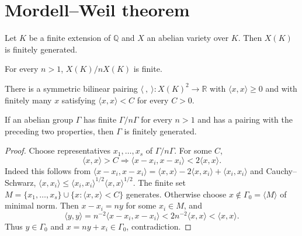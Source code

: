 \section{Mordell--Weil theorem}
\label{mumford-appendix-II-source}

\begin{theorem}\label{mumford-thm-mordell-weil}
Let $K$ be a finite extension of $\mathbb Q$ and $X$ an abelian variety over
$K$. Then $X(K)$ is finitely generated.
\end{theorem}
\begin{proposition}\label{mumford-prop-weak-mordell-weil}
\label{mumford-thm-weak-mordell-weil}
For every $n>1$, $X(K)/nX(K)$ is finite.
\end{proposition}
\begin{proposition}\label{mumford-prop-height-quadratic}
\label{mumford-prop-canonical-height}
There is a symmetric bilinear pairing $\langle\ ,\ \rangle:X(K)^2\to\mathbb R$
with $\langle x,x\rangle\ge0$ and with finitely many $x$ satisfying
$\langle x,x\rangle<C$ for every $C>0$.
\end{proposition}
\begin{proposition}\label{mumford-prop-formal-finite-generation}
\label{mumford-thm-mordell-weil-descent}
If an abelian group $\Gamma$ has finite $\Gamma/n\Gamma$ for every $n>1$ and
has a pairing with the preceding two properties, then $\Gamma$ is finitely generated.
\end{proposition}
\begin{proof}
Choose representatives $x_1,\ldots,x_s$ of $\Gamma/n\Gamma$. For some $C$,
\[
\langle x,x\rangle>C\Rightarrow\langle x-x_i,x-x_i\rangle<2\langle x,x\rangle.\tag{1}
\]
Indeed this follows from
$\langle x-x_i,x-x_i\rangle=\langle x,x\rangle-2\langle x,x_i\rangle+\langle x_i,x_i\rangle$
and Cauchy--Schwarz,
$\langle x,x_i\rangle\le\langle x_i,x_i\rangle^{1/2}\langle x,x\rangle^{1/2}$.
The finite set
$M=\{x_1,\ldots,x_s\}\cup\{x:\langle x,x\rangle<C\}$ generates. Otherwise choose
$x\notin\Gamma_0=\langle M\rangle$ of minimal norm. Then $x-x_i=ny$ for some
$x_i\in M$, and
\[
\langle y,y\rangle=n^{-2}\langle x-x_i,x-x_i\rangle<2n^{-2}\langle x,x\rangle<\langle x,x\rangle.
\]
Thus $y\in\Gamma_0$ and $x=ny+x_i\in\Gamma_0$, contradiction.

\end{proof}

